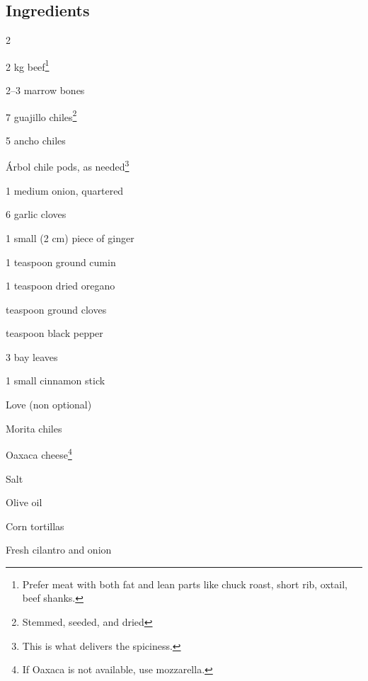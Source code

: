 \newpage
{}

\subsection*{Ingredients}
\begin{multicols}{2}
	\begin{ingredients}
	    \item 2 kg beef\footnote{Prefer meat with both fat and lean parts like chuck roast, short rib, oxtail, beef shanks.}
	    \item 2--3 marrow bones
	    \item 7 guajillo chiles\footnote{\label{note:chiles}Stemmed, seeded, and dried}
	    \item 5 ancho chiles
	    \item Árbol chile pods, as needed\footnote{This is what delivers the spiciness.}
	    \item 1 medium onion, quartered
	    \item 6 garlic cloves
	    \item 1 small (2 cm) piece of ginger
	    \item 1 teaspoon ground cumin
	    \item 1 teaspoon dried oregano
	    \item {} teaspoon ground cloves
	    \item {} teaspoon black pepper
	    \item 3 bay leaves
	    \item 1 small cinnamon stick
	    \item Love (non optional)
	    \item Morita chiles
	    \item Oaxaca cheese\footnote{If Oaxaca is not available, use mozzarella.}
	    \item Salt
	    \item Olive oil
	    \item Corn tortillas
	    \item Fresh cilantro and onion
	\end{ingredients}
\end{multicols}

\vspace{-0.5cm}

